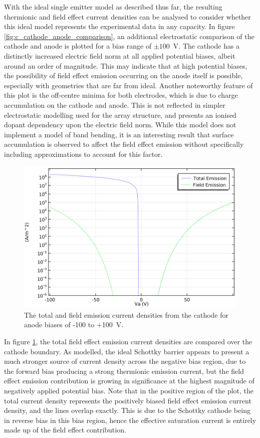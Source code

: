 \begin{refsection}
With the ideal single emitter model as described thus far, the resulting thermionic and field effect current densities can be analysed to consider whether this ideal model represents the experimental data in any capacity. In figure \ref{fig:c_cathode_anode_comparison}, an additional electrostatic comparison of the cathode and anode is plotted for a bias range of $\pm100$~\si{\volt}. The cathode has a distinctly increased electric field norm at all applied potential biases, albeit around an order of magnitude. This may indicate that at high potential biases, the possibility of field effect emission occurring on the anode itself is possible, especially with geometries that are far from ideal. Another noteworthy feature of this plot is the off-centre minima for both electrodes, which is due to charge accumulation on the cathode and anode. This is not reflected in simpler electrostatic modelling used for the array structure, and presents an ionised dopant dependency upon the electric field norm. While this model does not implement a model of band bending, it is an interesting result that surface accumulation is observed to affect the field effect emission without specifically including approximations to account for this factor.

\begin{figure}[H]
    \centering
    \includegraphics[width=0.8\linewidth]{Chapter7/Figs/Raster/Comsol/density_thermionic_field_comparison.png}
    \caption{The total and field emission current densities from the cathode for anode biases of -100 to +100~\si{\volt}.}
    \label{fig:c_density_thermionic_field_comparison}
\end{figure}

In figure \ref{fig:c_density_thermionic_field_comparison}, the total field effect emission current densities are compared over the cathode boundary. As modelled, the ideal Schottky barrier appears to present a much stronger source of current density across the negative bias region, due to the forward bias producing a strong thermionic emission current, but the field effect emission contribution is growing in significance at the highest magnitude of negatively applied potential bias. Note that in the positive region of the plot, the total current density represents the positively biased field effect emission current density, and the lines overlap exactly. This is due to the Schottky cathode being in reverse bias in this bias region, hence the effective saturation current is entirely made up of the field effect contribution.


\end{refsection}
